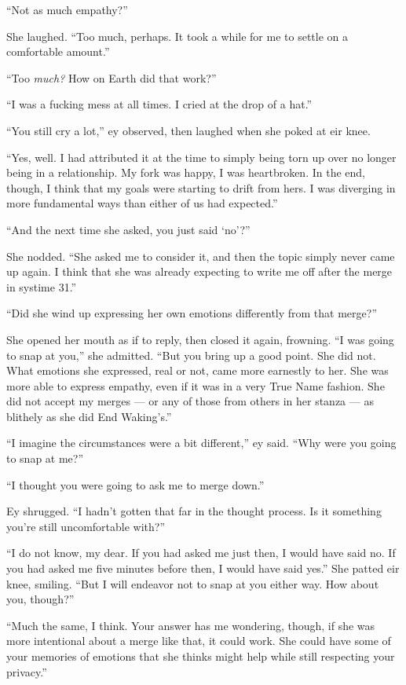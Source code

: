``Not as much empathy?''

She laughed. ``Too much, perhaps. It took a while for me to settle on a comfortable amount.''

``Too \emph{much?} How on Earth did that work?''

``I was a fucking mess at all times. I cried at the drop of a hat.''

``You still cry a lot,'' ey observed, then laughed when she poked at eir knee.

``Yes, well. I had attributed it at the time to simply being torn up over no longer being in a relationship. My fork was happy, I was heartbroken. In the end, though, I think that my goals were starting to drift from hers. I was diverging in more fundamental ways than either of us had expected.''

``And the next time she asked, you just said `no'?''

She nodded. ``She asked me to consider it, and then the topic simply never came up again. I think that she was already expecting to write me off after the merge in systime 31.''

``Did she wind up expressing her own emotions differently from that merge?''

She opened her mouth as if to reply, then closed it again, frowning. ``I was going to snap at you,'' she admitted. ``But you bring up a good point. She did not. What emotions she expressed, real or not, came more earnestly to her. She was more able to express empathy, even if it was in a very True Name fashion. She did not accept my merges — or any of those from others in her stanza — as blithely as she did End Waking's.''

``I imagine the circumstances were a bit different,'' ey said. ``Why were you going to snap at me?''

``I thought you were going to ask me to merge down.''

Ey shrugged. ``I hadn't gotten that far in the thought process. Is it something you're still uncomfortable with?''

``I do not know, my dear. If you had asked me just then, I would have said no. If you had asked me five minutes before then, I would have said yes.'' She patted eir knee, smiling. ``But I will endeavor not to snap at you either way. How about you, though?''

``Much the same, I think. Your answer has me wondering, though, if she was more intentional about a merge like that, it could work. She could have some of your memories of emotions that she thinks might help while still respecting your privacy.''

